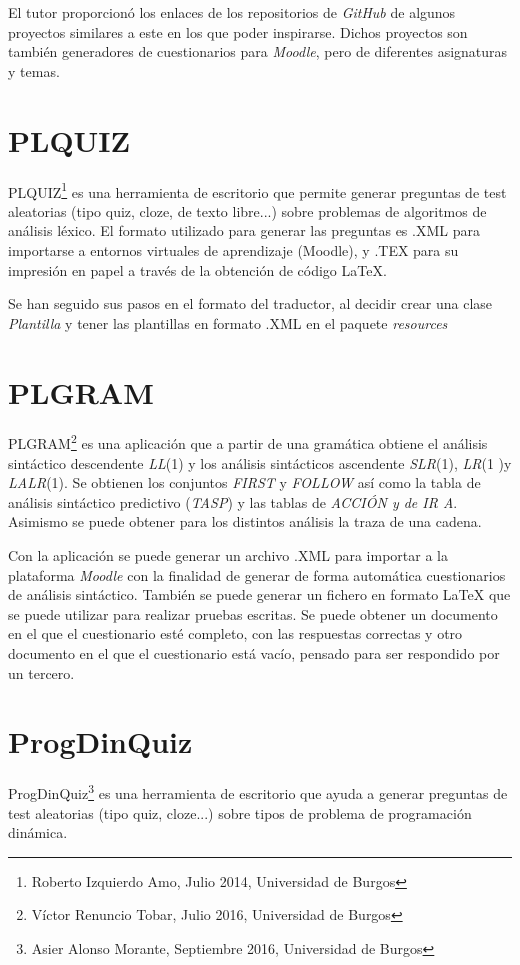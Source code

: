 
El tutor proporcionó los enlaces de los repositorios de \textit{GitHub} de algunos proyectos similares a este en los que poder inspirarse. Dichos proyectos son también generadores de cuestionarios para \textit{Moodle}, pero de diferentes asignaturas y temas.

\section{PLQUIZ}
PLQUIZ\footnote{Roberto Izquierdo Amo, Julio 2014, Universidad de Burgos} es una herramienta de escritorio que permite generar preguntas de test aleatorias (tipo quiz, cloze, de texto libre...) sobre problemas de algoritmos de análisis léxico. El formato utilizado para generar las preguntas es .XML para importarse a entornos virtuales de aprendizaje (Moodle), y .TEX para  su impresión en papel a través de la obtención de código \LaTeX{}.\cite{plquiz}

Se han seguido sus pasos en el formato del traductor, al decidir crear una clase \textit{Plantilla} y tener las plantillas en formato .XML en el paquete \textit{resources}

\section{PLGRAM}
PLGRAM\footnote{Víctor Renuncio Tobar, Julio 2016, Universidad de Burgos} es una aplicación que a partir de una gramática obtiene el análisis sintáctico descendente \textit{LL}(1) y los análisis sintácticos ascendente \textit{SLR}(1), \textit{LR}(1 )y \textit{LALR}(1). Se obtienen los conjuntos \textit{FIRST} y \textit{FOLLOW} así como la tabla de análisis sintáctico predictivo (\textit{TASP}) y las tablas de \textit{ACCIÓN y de IR A}. Asimismo se puede obtener para los distintos análisis la traza de una cadena.

Con la aplicación se puede generar un archivo .XML para importar a la plataforma \textit{Moodle} con la finalidad de generar de forma automática cuestionarios de análisis sintáctico. También se puede generar un fichero en formato \LaTeX{} que se puede utilizar para realizar pruebas escritas. Se puede obtener un documento en el que el cuestionario esté completo, con las respuestas correctas y otro documento en el que el cuestionario está vacío, pensado para ser respondido por un tercero.\cite{plgram}

\section{ProgDinQuiz}
ProgDinQuiz\footnote{Asier Alonso Morante, Septiembre 2016, Universidad de Burgos} es una herramienta de escritorio que ayuda a generar preguntas de test aleatorias (tipo quiz, cloze...) sobre tipos de problema de programación dinámica.\cite{progdinquiz}
